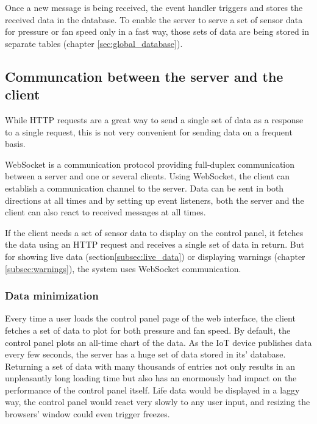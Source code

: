 Once a new message is being received, the event handler triggers and stores the received data in the database. To enable the server to serve a set of sensor data for pressure or fan speed only in a fast way, those sets of data are being stored in separate tables (chapter \ref{sec:global_database}).



\subsection{Communcation between the server and the client}
\label{subsec:communication_between_the_server_and_the_client}

While HTTP requests are a great way to send a single set of data as a response to a single request, this is not very convenient for sending data on a frequent basis.

WebSocket is a communication protocol providing full-duplex communication between a server and one or several clients. Using WebSocket, the client can establish a communication channel to the server. Data can be sent in both directions at all times and by setting up event listeners, both the server and the client can also react to received messages at all times.

If the client needs a set of sensor data to display on the control panel, it fetches the data using an HTTP request and receives a single set of data in return. But for showing live data (section\ref{subsec:live_data}) or displaying warnings (chapter \ref{subsec:warnings}), the system uses WebSocket communication.


\subsubsection{Data minimization}
\label{subsec:data_minimization}

Every time a user loads the control panel page of the web interface, the client fetches a set of data to plot for both pressure and fan speed. By default, the control panel plots an all-time chart of the data. As the IoT device publishes data every few seconds, the server has a huge set of data stored in its' database. Returning a set of data with many thousands of entries not only results in an unpleasantly long loading time but also has an enormously bad impact on the performance of the control panel itself. Life data would be displayed in a laggy way, the control panel would react very slowly to any user input, and resizing the browsers' window could even trigger freezes.

